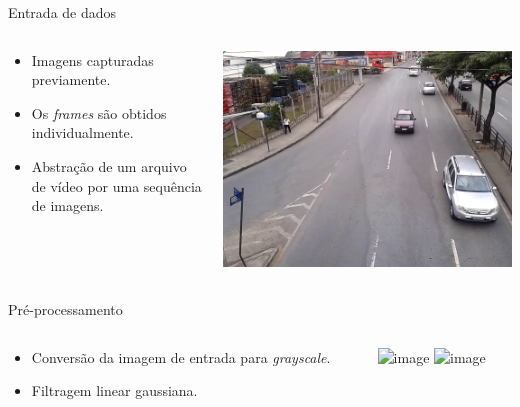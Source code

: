 \begin{frame}{Entrada de dados}
  \begin{columns}[T]
    \begin{column}{.5\textwidth}
      \begin{itemize}
        \item Imagens capturadas previamente.
        \item Os \textit{frames} são obtidos individualmente.
        \item Abstração de um arquivo de vídeo por uma sequência de imagens.
      \end{itemize}
    \end{column}
    \begin{column}{.5\textwidth}
      \begin{block}{}
        \includegraphics[width=\textwidth]{imgs/frame.png}
      \end{block}
    \end{column}
  \end{columns}
\end{frame}

\begin{frame}{Pré-processamento}
  \begin{columns}[T]
    \begin{column}{.5\textwidth}
      \begin{itemize}
        \item<1-> Conversão da imagem de entrada para \textit{grayscale}.
        \item<2-> Filtragem linear gaussiana.
      \end{itemize}
    \end{column}
    \begin{column}{.5\textwidth}
      \begin{block}{}
        \includegraphics<1>[width=\textwidth]{imgs/frame_gray.png}
        \includegraphics<2>[width=\textwidth]{imgs/gray.png}
      \end{block}
    \end{column}
  \end{columns}
\end{frame}

